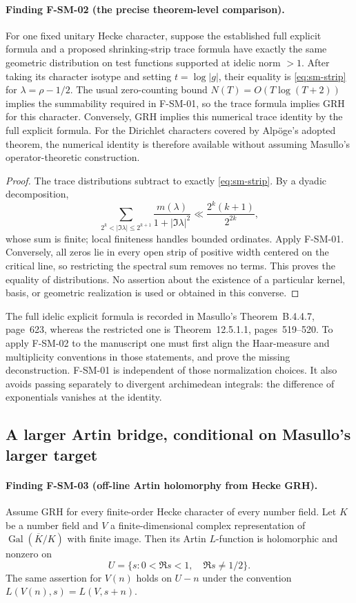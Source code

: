 \paragraph{Finding F-SM-02 (the precise theorem-level comparison).}
For one fixed unitary Hecke character, suppose the established full explicit formula
and a proposed shrinking-strip trace formula have exactly the same
geometric distribution on test functions supported at idelic norm $>1$.
After taking its character isotype and setting $t=\log|g|$, their equality
is \eqref{eq:sm-strip} for $\lambda=\rho-1/2$.  The usual zero-counting
bound $N(T)=O(T\log(T+2))$ implies the summability required in
F-SM-01, so the trace formula implies GRH for this character.  Conversely,
GRH implies this numerical trace identity by the full explicit formula.
For the Dirichlet characters covered by Alp\"oge's adopted theorem, the
numerical identity is therefore available without assuming Masullo's
operator-theoretic construction.

\begin{proof}
The trace distributions subtract to exactly \eqref{eq:sm-strip}.  By a
dyadic decomposition,
\[
 \sum_{2^k<|\Im\lambda|\leq2^{k+1}}
 \frac{m(\lambda)}{1+|\Im\lambda|^2}
 \ll \frac{2^k(k+1)}{2^{2k}},
\]
whose sum is finite; local finiteness handles bounded ordinates.
Apply F-SM-01.  Conversely, all zeros lie in every open strip of positive
width centered on the critical line, so restricting the spectral sum removes
no terms.  This proves the equality of distributions.  No assertion about
the existence of a particular kernel, basis, or geometric realization is
used or obtained in this converse.
\end{proof}

The full idelic explicit formula is recorded in Masullo's Theorem~B.4.4.7,
page~623, whereas the restricted one is Theorem~12.5.1.1,
pages~519--520.  To apply F-SM-02 to the manuscript one must first align the
Haar-measure and multiplicity conventions in those statements, and prove
the missing deconstruction.  F-SM-01 is independent of those normalization
choices.  It also avoids passing separately to divergent archimedean
integrals: the difference of exponentials vanishes at the identity.

\subsection{A larger Artin bridge, conditional on Masullo's larger target}

\paragraph{Finding F-SM-03 (off-line Artin holomorphy from Hecke GRH).}
Assume GRH for every finite-order Hecke character of every number field.
Let $K$ be a number field and $V$ a finite-dimensional complex
representation of $\operatorname{Gal}(\overline K/K)$ with finite image.
Then its Artin $L$-function is holomorphic and nonzero on
\[
 U=\{s:0<\Re s<1,\quad\Re s\ne1/2\}.
\]
The same assertion for $V(n)$ holds on $U-n$ under the convention
$L(V(n),s)=L(V,s+n)$.


